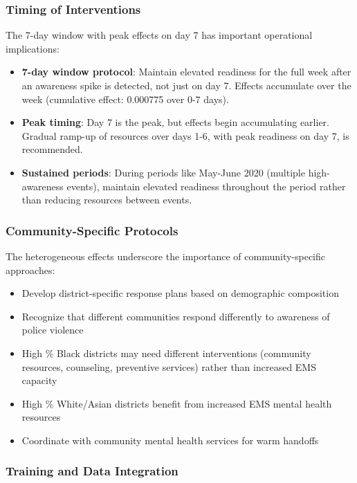 \documentclass[11pt,a4paper]{article}
\begin{document}
\subsubsection{Timing of Interventions}

The 7-day window with peak effects on day 7 has important operational implications:

\begin{itemize}
    \item \textbf{7-day window protocol}: Maintain elevated readiness for the full week after an awareness spike is detected, not just on day 7. Effects accumulate over the week (cumulative effect: 0.000775 over 0-7 days).
    \item \textbf{Peak timing}: Day 7 is the peak, but effects begin accumulating earlier. Gradual ramp-up of resources over days 1-6, with peak readiness on day 7, is recommended.
    \item \textbf{Sustained periods}: During periods like May-June 2020 (multiple high-awareness events), maintain elevated readiness throughout the period rather than reducing resources between events.
\end{itemize}

\subsubsection{Community-Specific Protocols}

The heterogeneous effects underscore the importance of community-specific approaches:

\begin{itemize}
    \item Develop district-specific response plans based on demographic composition
    \item Recognize that different communities respond differently to awareness of police violence
    \item High \% Black districts may need different interventions (community resources, counseling, preventive services) rather than increased EMS capacity
    \item High \% White/Asian districts benefit from increased EMS mental health resources
    \item Coordinate with community mental health services for warm handoffs
\end{itemize}

\subsubsection{Training and Data Integration}
\end{document}
